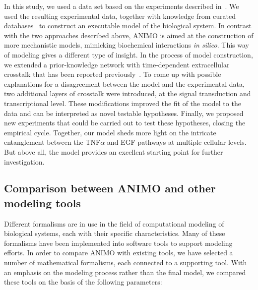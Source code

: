 \documentclass{bmcart}
\begin{document}
In this study, we used a data set based on the experiments described in~\cite{pathway-compendium}. We used the
resulting experimental data, together with knowledge from curated databases~\cite{kegg,phosphosite}
to construct an executable model of the biological system.
In contrast with the two approaches described above, ANIMO is aimed at the construction of
more mechanistic models, mimicking biochemical interactions \emph{in silico}. This way of modeling
gives a different type of insight. In the process of model construction, we extended a
prior-knowledge network with time-dependent extracellular crosstalk that has been reported
previously~\cite{pathway-autocrine}. To come up with possible explanations for a disagreement
between the model and the experimental data, two additional layers of
crosstalk were introduced, at the signal transduction and transcriptional level. These modifications
improved the fit of the model to the data and can be interpreted as novel testable hypotheses.
Finally, we proposed new experiments that could be carried out to test these hypotheses, closing the empirical cycle.
Together, our model sheds more light on the intricate
entanglement between the TNF$\alpha$ and EGF pathways at multiple cellular levels.
But above all,  the model provides an excellent starting point for further investigation.


\subsection*{Comparison between ANIMO and other modeling tools}\label{suppl:comparison-table}
Different formalisms are in use in the field of computational
modeling of biological systems, each with their specific characteristics.
Many of these formalisms have been implemented into
software tools to support modeling efforts. In order to compare
ANIMO with existing tools, we have selected a number of mathematical formalisms,
each connected to a supporting tool. With an emphasis on the modeling
process rather than the final model, we compared these tools on
the basis of the following parameters:
\end{document}
